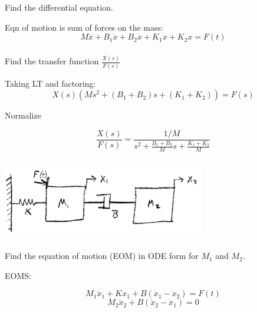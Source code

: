 \documentclass{article}	%
\begin{document}
\subsubsection{} Find the differential equation.

\begin{solution}
Eqn of motion is sum of forces on the mass:
\[
M\ddot{x} + B_1\dot{x} + B_2\dot{x} + K_1x + K_2x = F(t)
\]
\end{solution}

\subsubsection{}  Find the transfer function $\frac{X(s)}{F(s)}$

\begin{solution}
Taking LT and factoring:
\[
X(s) \left ( Ms^2 + (B_1+B_2)s+(K_1+K_2) \right ) = F(s)
\]

Normalize

\[
\frac{X(s)}{F(s)} = \frac {1/M}  { s^2+\frac{B_1+B_2}{M}s+\frac{K_1+K_2}{M} }
\]

\end{solution}




\subsection{}\label{2masstranslation}

\includegraphics[width=88mm]{00451a.png}

\subsubsection{} Find the equation of motion (EOM) in ODE form for $M_1$ and $M_2$.

\begin{solution}
EOMS:

\[
M_1\ddot{x}_1 + Kx_1+ B(\dot{x}_1-\dot{x}_2) = F(t)
\]
\[
M_2\ddot{x}_2 +  B(\dot{x}_2-\dot{x}_1) = 0
\]

\end{solution}
\end{document}
